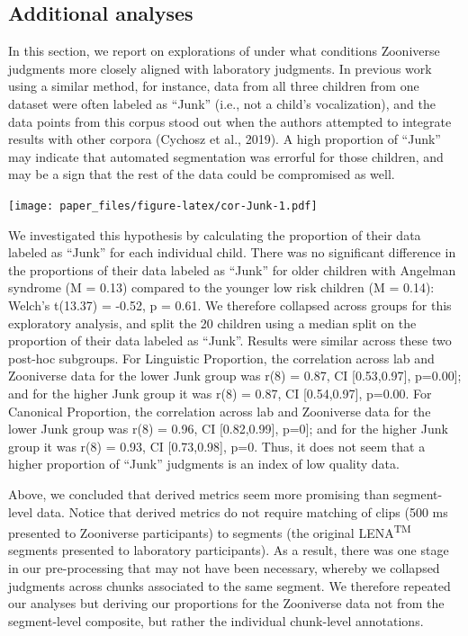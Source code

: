 \documentclass[english,,man,floatsintext]{apa6}
\begin{document}
\hypertarget{additional-analyses}{%
\subsection{Additional analyses}\label{additional-analyses}}

In this section, we report on explorations of under what conditions Zooniverse judgments more closely aligned with laboratory judgments. In previous work using a similar method, for instance, data from all three children from one dataset were often labeled as \enquote{Junk} (i.e., not a child's vocalization), and the data points from this corpus stood out when the authors attempted to integrate results with other corpora (Cychosz et al., 2019). A high proportion of \enquote{Junk} may indicate that automated segmentation was errorful for those children, and may be a sign that the rest of the data could be compromised as well.

\texttt{[image: paper\_files/figure-latex/cor-Junk-1.pdf]}

We investigated this hypothesis by calculating the proportion of their data labeled as \enquote{Junk} for each individual child. There was no significant difference in the proportions of their data labeled as \enquote{Junk} for older children with Angelman syndrome (M = 0.13) compared to the younger low risk children (M = 0.14): Welch's t(13.37) = -0.52, p = 0.61. We therefore collapsed across groups for this exploratory analysis, and split the 20 children using a median split on the proportion of their data labeled as \enquote{Junk}. Results were similar across these two post-hoc subgroups. For Linguistic Proportion, the correlation across lab and Zooniverse data for the lower Junk group was r(8) = 0.87, CI {[}0.53,0.97{]}, p=0.00{]}; and for the higher Junk group it was r(8) = 0.87, CI {[}0.54,0.97{]}, p=0.00. For Canonical Proportion, the correlation across lab and Zooniverse data for the lower Junk group was r(8) = 0.96, CI {[}0.82,0.99{]}, p=0{]}; and for the higher Junk group it was r(8) = 0.93, CI {[}0.73,0.98{]}, p=0. Thus, it does not seem that a higher proportion of \enquote{Junk} judgments is an index of low quality data.

Above, we concluded that derived metrics seem more promising than segment-level data. Notice that derived metrics do not require matching of clips (500 ms presented to Zooniverse participants) to segments (the original LENA\textsuperscript{TM} segments presented to laboratory participants). As a result, there was one stage in our pre-processing that may not have been necessary, whereby we collapsed judgments across chunks associated to the same segment. We therefore repeated our analyses but deriving our proportions for the Zooniverse data not from the segment-level composite, but rather the individual chunk-level annotations.
\end{document}
